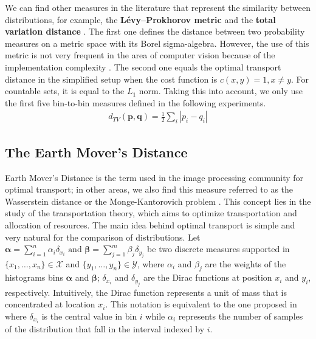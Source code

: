We can find other measures in the literature that represent the similarity between distributions, for example, the \textbf{Lévy–Prokhorov metric} \citep{Prokhorov:TPA:1956} and the \textbf{total variation distance} \citep{Bogachev.Kolesnikov:RMS:2012}. The first one defines the distance between two probability measures on a metric space with its Borel sigma-algebra. However, the use of this metric is not very frequent in the area of computer vision because of the implementation complexity \citep{Bogachev.Kolesnikov:RMS:2012}. The second one equals the optimal transport distance \citep{Cuturi.Avis:JMLR:2011} in the simplified setup when the cost function is $c(x,y)=1, x\neq y$. For countable sets, it is equal to the $L_1$ norm. Taking this into account, we only use the first five bin-to-bin measures defined in the following experiments.
\begin{eqnarray}
d_{TV}(\mathbf{p}, \mathbf{q}) = \frac{1}{2}\sum\nolimits_{i}|p_i - q_i | \label{eq:tv_dist}
\end{eqnarray}


\subsection{The Earth Mover's Distance}\label{subsec:EMD}
Earth Mover's Distance is the term used in the image processing community for optimal transport; in other areas, we also find this measure referred to as the Wasserstein distance \citep{Gibbs.Su:ISR:2002} or the Monge-Kantorovich problem \citep{Bogachev.Kolesnikov:RMS:2012, Kantorovich:JMS:2006}. This concept lies in the study of the transportation theory, which aims to optimize transportation and allocation of resources. The main idea behind optimal transport is simple and very natural for the comparison of distributions. 
Let
$
\boldsymbol{\alpha} = \sum_{i=1}^{n}\alpha_{i}\delta_{x_i} \text{  and  } \boldsymbol{\beta} = \sum_{j=1}^{m}\beta_{j}\delta_{y_j}
$
be two discrete measures supported in $\{x_1, \ldots, x_n\} \in \mathcal{X}$ and $\{y_1, \ldots, y_n\} \in \mathcal{Y}$, where $\alpha_i$ and $\beta_j$ are the weights of the histograms bins $\boldsymbol{\alpha}$ and $\boldsymbol{\beta}$; $\delta_{x_i}$ and $\delta_{y_j}$ are the Dirac functions at position $x_i$ and $y_i$, respectively. Intuitively, the Dirac function represents a unit of mass that is concentrated at location $x_i$. This notation is equivalent to the one proposed in \citep{Rubner.Tomasi.ea:IJCV:2000} where $\delta_{x_i}$ is the central value in bin $i$ while $\alpha_i$ represents the number of samples of the distribution that fall in the interval indexed by $i$.

